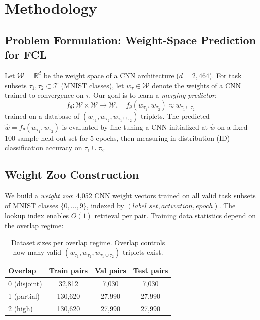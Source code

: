 \section{Methodology}
\label{sec:method}

\subsection{Problem Formulation: Weight-Space Prediction for FCL}

Let $\mathcal{W} = \mathbb{R}^d$ be the weight space of a CNN architecture ($d = 2{,}464$). For task subsets $\tau_1, \tau_2 \subset \mathcal{T}$ (MNIST classes), let $w_\tau \in \mathcal{W}$ denote the weights of a CNN trained to convergence on $\tau$. Our goal is to learn a \emph{merging predictor}:
\begin{equation}
f_\theta: \mathcal{W} \times \mathcal{W} \to \mathcal{W}, \quad
f_\theta(w_{\tau_1}, w_{\tau_2}) \approx w_{\tau_1 \cup \tau_2}
\label{eq:merge_objective}
\end{equation}
trained on a database of $(w_{\tau_1}, w_{\tau_2}, w_{\tau_1\cup\tau_2})$ triplets. The predicted $\hat{w} = f_\theta(w_{\tau_1}, w_{\tau_2})$ is evaluated by fine-tuning a CNN initialized at $\hat{w}$ on a fixed 100-sample held-out set for 5 epochs, then measuring in-distribution (ID) classification accuracy on $\tau_1 \cup \tau_2$.

\subsection{Weight Zoo Construction}

We build a \emph{weight zoo}: 4,052 CNN weight vectors trained on all valid task subsets of MNIST classes $\{0,\ldots,9\}$, indexed by $(label\_set, activation, epoch)$. The lookup index enables $O(1)$ retrieval per pair. Training data statistics depend on the overlap regime:

\begin{table}[h]
\centering\small
\begin{tabular}{lccc}
\hline
\textbf{Overlap} & \textbf{Train pairs} & \textbf{Val pairs} & \textbf{Test pairs} \\
\hline
0 (disjoint)  & 32,812  & 7,030  & 7,030 \\
1 (partial)   & 130,620 & 27,990 & 27,990 \\
2 (high)      & 130,620 & 27,990 & 27,990 \\
\hline
\end{tabular}
\caption{Dataset sizes per overlap regime. Overlap controls how many valid $(w_{\tau_1}, w_{\tau_2}, w_{\tau_1\cup\tau_2})$ triplets exist.}
\label{tab:dataset}
\end{table}


